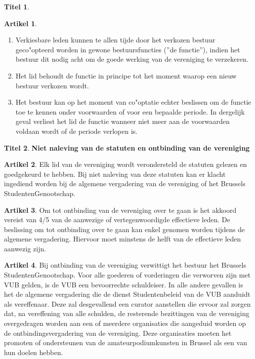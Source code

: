 \documentclass[a4paper,10pt]{article}
\theoremstyle{definition}
\newtheorem{titel}{\newline\Large Titel}
\newtheorem{artikel}{\large Artikel}
\newcommand{\ttext}[1]{\Large \textbf{#1} \normalsize}
\newcommand{\ttextcr}{\hfill\newline}
\newcommand{\ttextenum}{\mbox{}}
\begin{document}
\begin{titel}
  \begin{artikel}\label{bestuur-cooptatie}\ttextenum
    \begin{enumerate}
      \item
        Verkiesbare leden kunnen te allen tijde door het verkozen bestuur geco"opteerd worden in gewone bestuursfuncties (''de functie''), indien het bestuur dit nodig acht om de goede werking van de vereniging te verzekeren.
      \item
        Het lid behoudt de functie in principe tot het moment waarop een nieuw bestuur verkozen wordt.
      \item
        Het bestuur kan op het moment van co"optatie echter beslissen om de functie toe te kennen onder voorwaarden of voor een bepaalde periode.
        In dergelijk geval verliest het lid de functie wanneer niet meer aan de voorwaarden voldaan wordt of de periode verlopen is.
    \end{enumerate}
  \end{artikel}

\end{titel}


\begin{titel}\ttext{Niet naleving van de statuten en ontbinding van de vereniging}

  \begin{artikel}\ttextcr
    Elk lid van de vereniging wordt verondersteld de statuten gelezen en goedgekeurd te hebben.
    Bij niet naleving van deze statuten kan er klacht ingediend worden bij de algemene vergadering van de vereniging of het Brussels StudentenGenootschap.
  \end{artikel}

  \begin{artikel}\ttextcr
    Om tot ontbinding van de vereniging over te gaan is het akkoord vereist van 4/5 van de aanwezige of vertegenwoordigde effectieve leden.
    De beslissing om tot ontbinding over te gaan kan enkel genomen worden tijdens de algemene vergadering.
    Hiervoor moet minstens de helft van de effectieve leden aanwezig zijn.
  \end{artikel}

  \begin{artikel}\ttextcr
    Bij ontbinding van de vereniging verwittigt het bestuur het Brussels StudentenGenootschap.
    Voor alle goederen of vorderingen die verworven zijn met VUB gelden, is de VUB een bevoorrechte schuldeiser.
    In alle andere gevallen is het de algemene vergadering die de dienst Studentenbeleid van de VUB aanduidt als vereffenaar.
    Deze zal desgevallend een curator aanstellen die ervoor zal zorgen dat, na vereffening van alle schulden, de resterende bezittingen van de vereniging overgedragen worden aan een of meerdere organisaties die aangeduid worden op de ontbindingsvergadering van de vereniging.
    Deze organisaties moeten het promoten of ondersteunen van de amateurpodiumkunsten in Brussel als een van hun doelen hebben.
  \end{artikel}

\end{titel}
\end{document}
